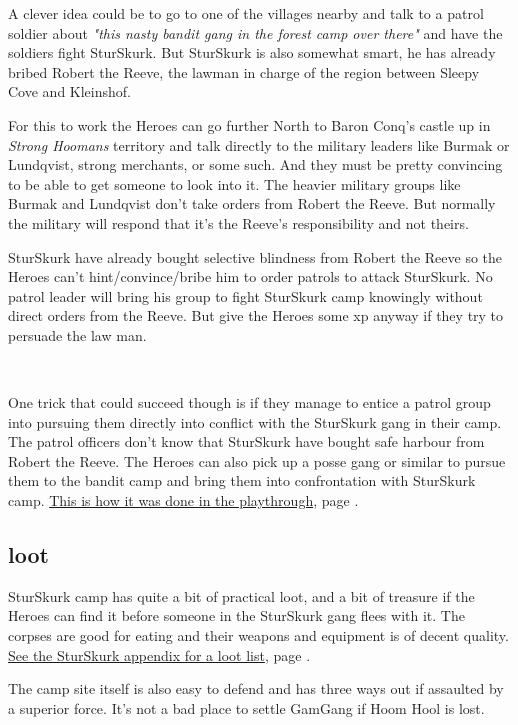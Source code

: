 A clever idea could be to go to one of the villages nearby and talk to a patrol soldier about \emph{"this nasty bandit gang in the forest camp over there"} and have the soldiers fight SturSkurk. But SturSkurk is also somewhat smart, he has already bribed Robert the Reeve, the lawman in charge of the region between Sleepy Cove and Kleinshof.

For this to work the Heroes can go further North to Baron Conq's castle up in \emph{Strong Hoomans} territory and talk directly to the military leaders like Burmak or Lundqvist, strong merchants, or some such. And they must be pretty convincing to be able to get someone to look into it.
The heavier military groups like Burmak and Lundqvist don't take orders from Robert the Reeve. But normally the military will respond that it's the Reeve's responsibility and not theirs.

SturSkurk have already bought selective blindness from Robert the Reeve so the Heroes can't hint/convince/bribe him to order patrols to attack SturSkurk. No patrol leader will bring his group to fight SturSkurk camp knowingly without direct orders from the Reeve. But give the Heroes some xp anyway if they try to persuade the law man.

\

One trick that could succeed though is if they manage to entice a patrol group into pursuing them directly into conflict with the SturSkurk gang in their camp. The patrol officers don't know that SturSkurk have bought safe harbour from Robert the Reeve. The Heroes can also pick up a posse gang or similar to pursue them to the bandit camp and bring them into confrontation with SturSkurk camp. \hyperref[playthroughkillthebandits]{This is how it was done in the playthrough}, page \pageref{playthroughkillthebandits}.


\subsection*{loot}

SturSkurk camp has quite a bit of practical loot, and a bit of treasure if the Heroes can find it before someone in the SturSkurk gang flees with it. The corpses are good for eating and their weapons and equipment is of decent quality. 
\hyperref[appendixsturskurk]{See the SturSkurk appendix for a loot list}, page \pageref{appendixsturskurk}.


The camp site itself is also easy to defend and has three ways out if assaulted by a superior force. It's not a bad place to settle GamGang if Hoom Hool is lost.

